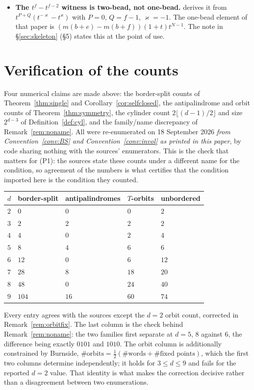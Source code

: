 \documentclass[11pt]{article}
\theoremstyle{definition}
\theoremstyle{remark}
\begin{document}
\begin{itemize}
\item[\textbf{(P4)}] \textbf{The $t^{f}-t^{f-2}$ witness is two-bead, not one-bead.}
  \cite[\texttt{prop:psiwitness}]{Q92} derives it from $t^{P+Q}(t^{-\varkappa}-t^{\varkappa})$
  with $P=0$, $Q=f-1$, $\varkappa=-1$.  The one-bead element of that paper is
  $(m(b+e)-m(b+f))(1+t)t^{N-1}$.  The note in \S\ref{sec:skeleton} (\S5) states this at the
  point of use.
\end{itemize}

\section{Verification of the counts}\label{sec:verify}

Four numerical claims are made above: the border-split counts of Theorem~\ref{thm:single} and
Corollary~\ref{cor:selfclosed}, the antipalindrome and orbit counts of
Theorem~\ref{thm:symmetry}, the cylinder count $2\lfloor(d-1)/2\rfloor$ and size $2^{d-3}$ of
Definition~\ref{def:cyl}, and the family/name discrepancy of Remark~\ref{rem:noname}.  All were
re-enumerated on 18 September 2026 \emph{from Convention~\ref{conv:BS} and
Convention~\ref{conv:invol} as printed in this paper}, by code sharing nothing with the sources'
enumerators.  This is the check that matters for (P1): the sources state these counts under a
different name for the condition, so agreement of the numbers is what certifies that the
condition imported here is the condition they counted.

\begin{center}
\begin{tabular}{@{}lllll@{}}
\hline
$d$ & border-split & antipalindromes & $T$-orbits & unbordered\\
\hline
$2$ & $0$ & $0$ & $0$ & $2$\\
$3$ & $2$ & $2$ & $2$ & $2$\\
$4$ & $4$ & $0$ & $2$ & $4$\\
$5$ & $8$ & $4$ & $6$ & $6$\\
$6$ & $12$ & $0$ & $6$ & $12$\\
$7$ & $28$ & $8$ & $18$ & $20$\\
$8$ & $48$ & $0$ & $24$ & $40$\\
$9$ & $104$ & $16$ & $60$ & $74$\\
\hline
\end{tabular}
\end{center}

Every entry agrees with the sources except the $d=2$ orbit count, corrected in
Remark~\ref{rem:orbitfix}.  The last column is the check behind Remark~\ref{rem:noname}: the
two families first separate at $d=5$, $8$ against $6$, the difference being exactly $0101$ and
$1010$.  The orbit column is additionally constrained by Burnside,
$\#\text{orbits}=\tfrac12(\#\text{words}+\#\text{fixed points})$, which the first two columns
determine independently; it holds for $3\le d\le9$ and fails for the reported $d=2$ value.
That identity is what makes the correction decisive rather than a disagreement between two
enumerations.
\end{document}
